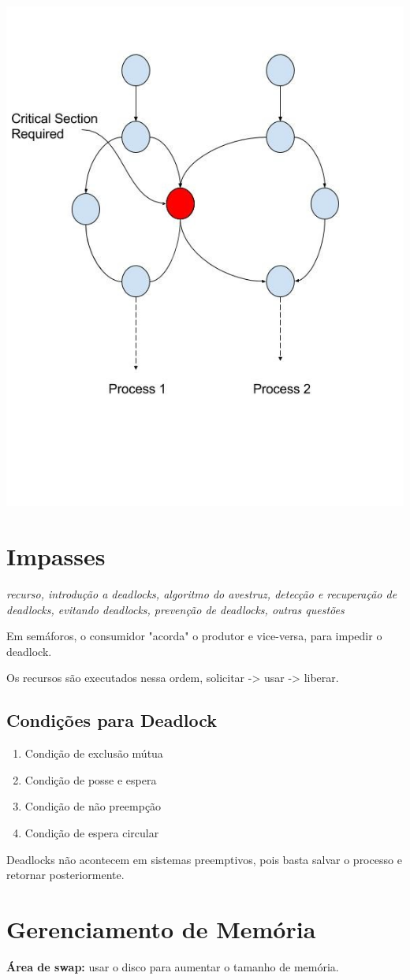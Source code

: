 \documentclass[ ]{article}
\begin{document}
		\includegraphics[scale=0.8]{images/critical_section.jpg}
	\section{Impasses}
		\textit{recurso, introdução a deadlocks, algoritmo do avestruz, detecção e recuperação de deadlocks, evitando deadlocks, prevenção de deadlocks, outras questões}
		
		Em semáforos, o consumidor "acorda" o produtor e vice-versa, para impedir o deadlock.	
		
		Os recursos são executados nessa ordem, solicitar -> usar -> liberar.
		\subsection{Condições para Deadlock}
		\begin{enumerate}
			\item Condição de exclusão mútua
			\item Condição de posse e espera
			\item Condição de não preempção
			\item Condição de espera circular
		\end{enumerate}
		Deadlocks não acontecem em sistemas preemptivos, pois basta salvar o processo e retornar posteriormente.
	\section{Gerenciamento de Memória}
		\textbf{Área de swap:} usar o disco para aumentar o tamanho de memória.
\end{document}

